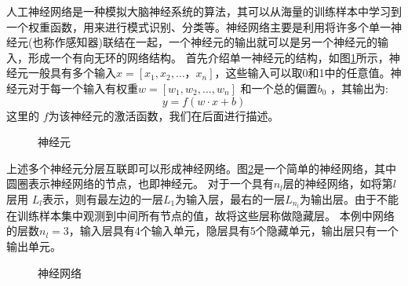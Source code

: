 人工神经网络是一种模拟大脑神经系统的算法，其可以从海量的训练样本中学习到一个权重函数，用来进行模式识别、分类等。神经网络主要是利用将许多个单一神经元(也称作感知器)联结在一起，一个神经元的输出就可以是另一个神经元的输入，形成一个有向无环的网络结构。
首先介绍单一神经元的结构，如图\ref{fig:neural}所示，神经元一般具有多个输入$x=[x_1,x_2,\dots，x_n] $，这些输入可以取0和1中的任意值。神经元对于每一个输入有权重$w=[w_1,w_2,\dots,w_n] $ 和一个总的偏置$b_0$ ，其输出为:
\begin{equation}
  y = f(w\cdot x + b)
  \label{equ:neural}
\end{equation}
这里的 $f$为该神经元的激活函数，我们在后面进行描述。

\begin{figure}
  \centering
  
  \caption{神经元}
  \label{fig:neural}
\end{figure}

上述多个神经元分层互联即可以形成神经网络。图\ref{fig:network}是一个简单的神经网络，其中圆圈表示神经网络的节点，也即神经元。
对于一个具有$n_l$层的神经网络，如将第$ l $层用 $ L_l$表示，则有最左边的一层$  L_1$为输入层，最右的一层$ L_{n_l} $为输出层。由于不能在训练样本集中观测到中间所有节点的值，故将这些层称做隐藏层。
本例中网络的层数$ n_l=3$，输入层具有4个输入单元，隐层具有5个隐藏单元，输出层只有一个输出单元。

\begin{figure}
  \centering
  
  \caption{神经网络}
  \label{fig:network}
\end{figure}


